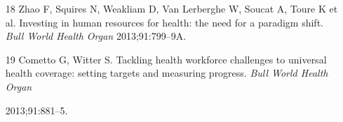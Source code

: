 \documentclass{article}
\begin{document}
\begin{itemize}
\item[18] Zhao F, Squires N, Weakliam D, Van Lerberghe W, Soucat A, Toure K et
al. Investing
in human resources for health: the need for a paradigm shift. \textit{Bull World
Health
Organ}
2013;91:799–9A.

\item[19] Cometto G, Witter S. Tackling health workforce challenges to universal
health
coverage: setting targets and measuring progress. \textit{Bull World Health
Organ}

2013;91:881–5.

\end{itemize}
\end{document}
